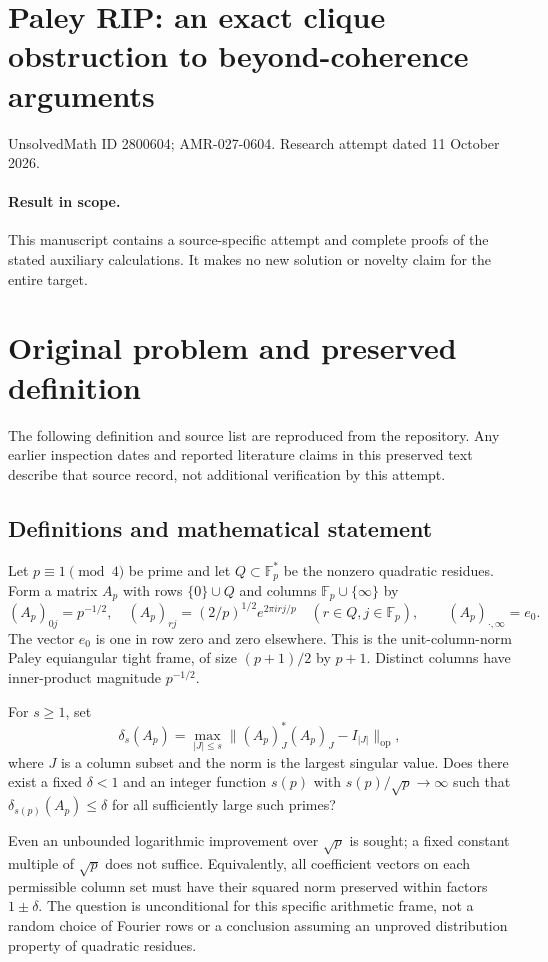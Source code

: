 \documentclass[11pt]{article}
\begin{document}
\section*{Paley RIP: an exact clique obstruction to beyond-coherence arguments}
\noindent UnsolvedMath ID 2800604; AMR-027-0604. Research attempt dated 11 October 2026.
\paragraph{Result in scope.}This manuscript contains a source-specific attempt and complete proofs of the stated auxiliary calculations. It makes no new solution or novelty claim for the entire target.
\section{Original problem and preserved definition}
The following definition and source list are reproduced from the repository. Any earlier inspection dates and reported literature claims in this preserved text describe that source record, not additional verification by this attempt.
\subsection{Definitions and mathematical statement}
Let $p\equiv1\pmod4$ be prime and let $Q\subset\mathbb F_p^*$ be
the nonzero quadratic residues. Form a matrix $A_p$ with rows
$\{0\}\cup Q$ and columns $\mathbb F_p\cup\{\infty\}$ by
\[
 (A_p)_{0j}=p^{-1/2},\quad
 (A_p)_{rj}=(2/p)^{1/2}e^{2\pi i rj/p}\quad(r\in Q,j\in\mathbb F_p),
 \qquad (A_p)_{\cdot,\infty}=e_0.
\]
The vector $e_0$ is one in row zero and zero elsewhere. This is the
unit-column-norm Paley equiangular tight frame, of size
$(p+1)/2$ by $p+1$. Distinct columns have inner-product magnitude
$p^{-1/2}$.

For $s\ge1$, set
\[
 \delta_s(A_p)=\max_{|J|\le s}
                 \|(A_p)_J^*(A_p)_J-I_{|J|}\|_{\mathrm{op}},
\]
where $J$ is a column subset and the norm is the largest singular
value. Does there exist a fixed $\delta<1$ and an integer function
$s(p)$ with $s(p)/\sqrt p\to\infty$ such that
$\delta_{s(p)}(A_p)\le\delta$ for all sufficiently large such primes?

Even an unbounded logarithmic improvement over $\sqrt p$ is sought;
a fixed constant multiple of $\sqrt p$ does not suffice. Equivalently,
all coefficient vectors on each permissible column set must have their
squared norm preserved within factors $1\pm\delta$. The question is
unconditional for this specific arithmetic frame, not a random choice
of Fourier rows or a conclusion assuming an unproved distribution
property of quadratic residues.
\end{document}
